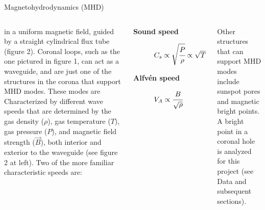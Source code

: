 \documentclass[t]{beamer}
\begin{document}
\begin{frame}[t]
\begin{block}{}
\begin{columns}
\begin{block}{Magnetohydrodynamics (MHD)}
\begin{columns}
                in a uniform magnetic field, guided by a straight cylindrical
                flux tube (\textcolor{myblue}{figure 2}).
                Coronal loops, such as the one pictured in
                \textcolor{myblue}{figure 1}, can act as
                a waveguide, and
                are just one of the structures in the corona
                that support MHD modes. These modes are
                Characterized by different wave speeds that are determined by
                the gas density ($\rho$), gas temperature ($T$),
                gas pressure ($P$), and magnetic field strength
                ($\vec{B}$), both interior and exterior to the waveguide
                (see figure 2 at left). Two of the more familiar characteristic
                speeds are:
                \vspace{20pt}
                \begin{description}
                    \item [\textbf{Sound speed}]
                        $C_s\propto\sqrt{\cfrac{P}{\rho}}\propto\sqrt{T}$
                    \par\vspace{20pt}
                    \item [\textbf{Alfv\'en speed}]
                        $V_A\propto\cfrac{B}{\sqrt{\rho}}$
                \end{description}
                \vspace{20pt}
                Other structures that can support MHD modes include sunspot pores
                and magnetic bright points. A bright point in a coronal hole is
                analyzed for this project (see \textcolor{mygreen}{Data} and
                subsequent sections).
            \end{columns}
        \end{block}


\end{columns}
\end{block}
\end{frame}
\end{document}
